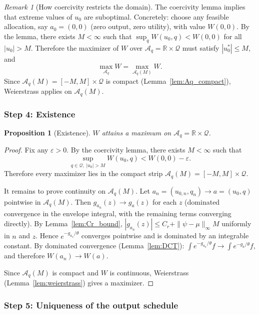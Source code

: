 \documentclass[12pt,a4paper]{article}
\theoremstyle{definition}
\theoremstyle{plain}
\newtheorem{proposition}{Proposition}[section]
\theoremstyle{remark}
\newtheorem{remark}{Remark}[section]
\newcommand{\R}{\mathbb{R}}
\newcommand{\calA}{\mathcal{A}}
\begin{document}
\begin{remark}[How coercivity restricts the domain]
\label{rem:coercivity_use}
The coercivity lemma implies that extreme values of $u_0$
are suboptimal.  Concretely: choose any feasible
allocation, say $a_0 = (0, 0)$ (zero output, zero
utility), with value $W(0, 0)$.  By the lemma, there
exists $M < \infty$ such that
$\sup_q W(u_0, q) < W(0, 0)$ for all $|u_0| > M$.
Therefore the maximizer of $W$ over
$\calA_q = \R \times \mathcal{Q}$ must satisfy
$|u_0^*| \leq M$, and
\[
  \max_{\calA_q} W = \max_{\calA_q(M)} W.
\]
Since $\calA_q(M) = [-M, M] \times \mathcal{Q}$ is
compact (Lemma~\ref{lem:Aq_compact}), Weierstrass
applies on $\calA_q(M)$.
\end{remark}


\subsubsection{Step 4: Existence}

\begin{proposition}[Existence]
\label{prop:existence}
$W$ attains a maximum on $\calA_q = \R \times \mathcal{Q}$.
\end{proposition}

\begin{proof}
Fix any $\varepsilon > 0$.
By the coercivity lemma, there exists $M < \infty$ such that
\[
  \sup_{q \in \mathcal{Q},\; |u_0| > M} W(u_0, q)
  < W(0, 0) - \varepsilon.
\]
Therefore every maximizer lies in the compact strip
$\calA_q(M) = [-M, M] \times \mathcal{Q}$.

It remains to prove continuity on $\calA_q(M)$.
Let $a_n = (u_{0,n}, q_n) \to a = (u_0, q)$ pointwise
in $\calA_q(M)$.  Then
$g_{a_n}(z) \to g_a(z)$ for each $z$
(dominated convergence in the envelope integral, with the
remaining terms converging directly).
By Lemma~\ref{lem:Cr_bound},
$|g_{a_n}(z)| \leq C_r + \|\psi - \mu\|_\infty M$
uniformly in $n$ and $z$.  Hence
$e^{-g_{a_n}/\theta}$ converges pointwise and is
dominated by an integrable constant.  By dominated
convergence (Lemma~\ref{lem:DCT}):
$\int e^{-g_{a_n}/\theta}f \to \int e^{-g_a/\theta}f$,
and therefore $W(a_n) \to W(a)$.

Since $\calA_q(M)$ is compact and $W$ is continuous,
Weierstrass (Lemma~\ref{lem:weierstrass}) gives a
maximizer.
\end{proof}


\subsubsection{Step 5: Uniqueness of the output schedule}
\end{document}

